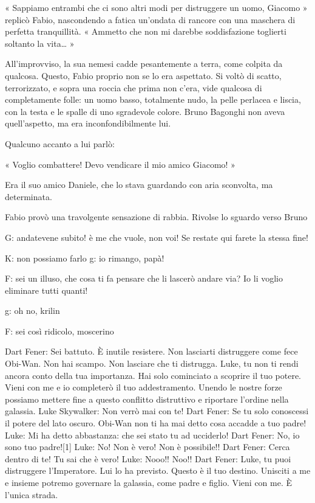 « Sappiamo entrambi che ci sono altri modi per distruggere un uomo, Giacomo » replicò Fabio, nascondendo a fatica un'ondata di rancore con una maschera di perfetta tranquillità. « Ammetto che non mi darebbe soddisfazione toglierti soltanto la vita… »

All'improvviso, la sua nemesi cadde pesantemente a terra, come colpita da qualcosa. Questo, Fabio proprio non se lo era aspettato. Si voltò di scatto, terrorizzato, e sopra una roccia che prima non c'era, vide qualcosa di completamente folle: un uomo basso, totalmente nudo, la pelle perlacea e liscia, con la testa e le spalle di uno sgradevole colore. Bruno Bagonghi non aveva quell'aspetto, ma era inconfondibilmente lui.

Qualcuno accanto a lui parlò:

« Voglio combattere! Devo vendicare il mio amico Giacomo! »

Era il suo amico Daniele, che lo stava guardando con aria sconvolta, ma determinata. 

Fabio provò una travolgente sensazione di rabbia. Rivolse lo sguardo verso Bruno

G: andatevene subito! è me che vuole, non voi! Se restate qui farete la stessa fine!

K: non possiamo farlo
g: io rimango, papà!

F: sei un illuso, che cosa ti fa pensare che li lascerò andare via? Io li voglio eliminare tutti quanti!

g: oh no, krilin

F: sei così ridicolo, moscerino

Dart Fener: Sei battuto. È inutile resistere. Non lasciarti distruggere come fece Obi-Wan. Non hai scampo. Non lasciare che ti distrugga. Luke, tu non ti rendi ancora conto della tua importanza. Hai solo cominciato a scoprire il tuo potere. Vieni con me e io completerò il tuo addestramento. Unendo le nostre forze possiamo mettere fine a questo conflitto distruttivo e riportare l'ordine nella galassia.
Luke Skywalker: Non verrò mai con te!
Dart Fener: Se tu solo conoscessi il potere del lato oscuro. Obi-Wan non ti ha mai detto cosa accadde a tuo padre!
Luke: Mi ha detto abbastanza: che sei stato tu ad ucciderlo!
Dart Fener: No, io sono tuo padre![1]
Luke: No! Non è vero! Non è possibile!!
Dart Fener: Cerca dentro di te! Tu sai che è vero!
Luke: Nooo!! Noo!!
Dart Fener: Luke, tu puoi distruggere l'Imperatore. Lui lo ha previsto. Questo è il tuo destino. Unisciti a me e insieme potremo governare la galassia, come padre e figlio. Vieni con me. È l'unica strada.